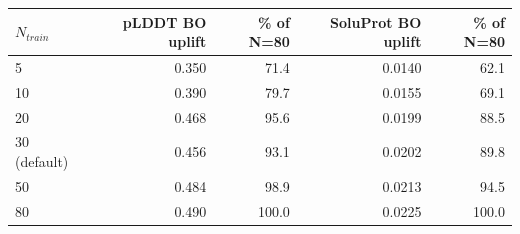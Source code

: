 \begin{tabular}{lrrrr}
\toprule
$N_{train}$ & pLDDT BO uplift & \% of N=80 & SoluProt BO uplift & \% of N=80 \\
\midrule
5 & 0.350 & 71.4 & 0.0140 & 62.1 \\
10 & 0.390 & 79.7 & 0.0155 & 69.1 \\
20 & 0.468 & 95.6 & 0.0199 & 88.5 \\
30 (default) & 0.456 & 93.1 & 0.0202 & 89.8 \\
50 & 0.484 & 98.9 & 0.0213 & 94.5 \\
80 & 0.490 & 100.0 & 0.0225 & 100.0 \\
\bottomrule
\end{tabular}
